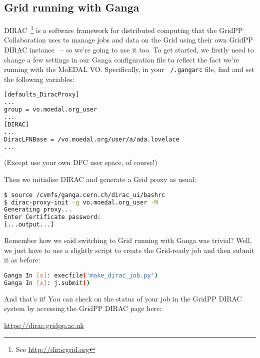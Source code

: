 \subsection{Grid running with Ganga}
\label{sec:moedalgridrunning}
\acs{DIRAC}~\cite{DIRAC2010}\footnote{%
See \href{http://diracgrid.org/}{http://diracgrid.org}} is a software
framework for distributed
computing that the GridPP Collaboration uses to manage
jobs and data on the Grid using their own
GridPP \ac{DIRAC} instance~\cite{GRIDPPDIRAC2015a,GRIDPPDIRAC2015b} --
so we're going to use it too.
To get started, we firstly need to change a few settings in our
Ganga configuration file to reflect the fact we're running
with the \ac{MoEDAL} \ac{VO}. Specifically, in your
\texttt{~/.gangarc} file, find and set the following variables:
 
\begin{lstlisting}[gobble=0,numbers=none,language=bash]
[defaults_DiracProxy]
...
group = vo.moedal.org_user
...
[DIRAC]
...
DiracLFNBase = /vo.moedal.org/user/a/ada.lovelace
...
\end{lstlisting}

(Except use your own \ac{DFC} user space, of course!)

Then we initialise \ac{DIRAC} and generate a Grid proxy as usual:

\begin{lstlisting}[gobble=0,numbers=none,language=bash]
$ source /cvmfs/ganga.cern.ch/dirac_ui/bashrc
$ dirac-proxy-init -g vo.moedal.org_user -M
Generating proxy... 
Enter Certificate password:
[...output...]
\end{lstlisting}

Remember how we said switching to Grid running with Ganga was trivial?
Well, we just have to use a slightly script to create the Grid-ready job
and then submit it as before:

\begin{lstlisting}[gobble=0,numbers=none,language=bash]
Ganga In [x]: execfile('make_dirac_job.py') 
Ganga In [x]: j.submit()
\end{lstlisting}

And that's it!
You can check on the status of your job in the GridPP DIRAC
system by accessing the GridPP DIRAC page here:

\href{https://dirac.gridpp.ac.uk}{https://dirac.gridpp.ac.uk}

